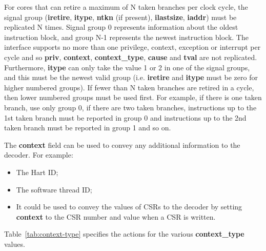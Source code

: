 For cores that can retire a maximum of N taken branches per clock
cycle, the signal group (\textbf{iretire}, \textbf{itype},
\textbf{ntkn} (if present), \textbf{ilastsize}, \textbf{iaddr}) must be replicated N times. Signal group 0
represents information about the oldest instruction block, and group N-1
represents the newest instruction block. The interface supports no more
than one privilege, context, exception or interrupt per cycle and so \textbf{priv}, 
\textbf{context}, \textbf{context\_type}, \textbf{cause} and
\textbf{tval} are not replicated. Furthermore, \textbf{itype} can only
take the value 1 or 2 in one of the signal groups, and this must be
the newest valid group (i.e. \textbf{iretire} and \textbf{itype} must
be zero for higher numbered groups). If fewer than N taken branches
are retired in a cycle, then lower numbered groups must be used
first. For example, if there is one taken branch, use only group 0, if
there are two taken branches, instructions up to the 1st taken branch
must be reported in group 0 and instructions up to the 2nd taken branch
must be reported in group 1 and so on.

The \textbf{context} field can be used to convey any additional information to the decoder.  For example:

\begin{itemize}
  \item The Hart ID;
  \item The software thread ID;
  \item It could be used to convey the values of CSRs to the decoder by setting \textbf{context} to the 
    CSR number and value when a CSR is written.
\end{itemize}

Table~\ref{tab:context-type} specifies the actions for the various \textbf{context\_type} values.

